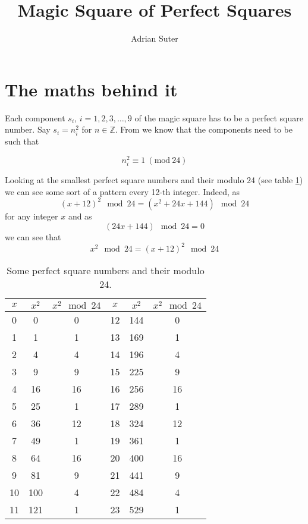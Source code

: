 \documentclass[reqno,10pt,a4paper]{article}
\title{Magic Square of Perfect Squares}
\author{Adrian Suter}
\begin{document}
	
	\maketitle
	
	\section{The maths behind it}
	
	Each component $s_i$, $i = 1, 2, 3, \ldots, 9$ of the magic square has to be a perfect square number. Say $s_i = n_i^2$ for $n \in \mathbb{Z}$. From \cite{zimmermann2015} we know that the components need to be such that
	
	\begin{equation} \label{eq:conditionMod24}
		n_i^2 \equiv 1~(\textrm{mod}~24)
	\end{equation}
	
	Looking at the smallest perfect square numbers and their modulo 24 (see table \ref{perfectSquares}) we can see some sort of a pattern every 12-th integer. Indeed, as
	\begin{equation}
	(x + 12)^2 \mod 24 = (x^2 + 24x + 144) \mod 24
	\end{equation}
	for any integer $x$ and as
	\begin{equation}
	(24x + 144) \mod 24 = 0
	\end{equation}
	we can see that
	\begin{equation}
	x^2 \mod 24 = (x + 12)^2 \mod 24
	\end{equation}
	
	\begin{table}
			\begin{tabular}{|c|c|c||c|c|c|}
			\hline
			$x$ & $x^2$ & $x^2 \mod 24$ & $x$ & $x^2$ & $x^2 \mod 24$ \\
			\hline
			0 & 0 & 0 & 12 & 144 & 0 \\
			1 & 1 & 1 & 13 & 169 & 1 \\
			2 & 4 & 4 & 14 & 196 & 4 \\
			3 & 9 & 9 & 15 & 225 & 9 \\
			4 & 16 & 16 & 16 & 256 & 16 \\
			5 & 25 & 1 & 17 & 289 & 1 \\
			6 & 36 & 12 & 18 & 324 & 12 \\
			7 & 49 & 1 & 19 & 361 & 1 \\
			8 & 64 & 16 & 20 & 400 & 16 \\
			9 & 81 & 9 & 21 & 441 & 9 \\
			10 & 100 & 4 & 22 & 484 & 4 \\
			11 & 121 & 1 & 23 & 529 & 1 \\
			\hline
		\end{tabular}
		\caption{Some perfect square numbers and their modulo 24.} \label{perfectSquares}
	\end{table}
	
\end{document}
